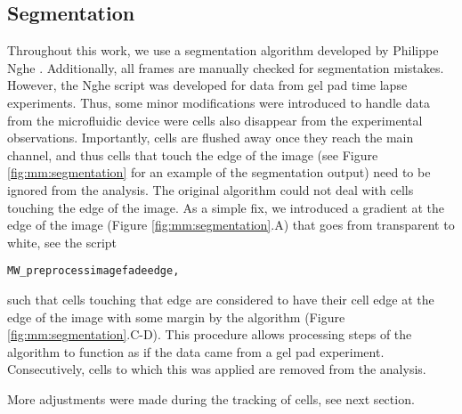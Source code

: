\subsection{Segmentation}

Throughout this work, we use a segmentation algorithm developed by Philippe Nghe \cite{Walker2016t}. Additionally, all frames are manually checked for segmentation mistakes.
However, the Nghe script was developed for data from gel pad time lapse experiments.
Thus, some minor modifications were introduced to handle data from the microfluidic device were cells also disappear from the experimental observations.
%
Importantly, cells are flushed away once they reach the main channel, and thus cells that touch the edge of the image (see Figure \ref{fig:mm:segmentation} for an example of the segmentation output) need to be ignored from the analysis.
The original algorithm could not deal with cells touching the edge of the image. 
As a simple fix, we introduced a gradient at the edge of the image (Figure \ref{fig:mm:segmentation}.A) that goes from transparent to white, see the script 
\begin{verbatim}
MW_preprocessimagefadeedge, 
\end{verbatim}
such that cells touching that edge are considered to have their cell edge at the edge of the image with some margin by the algorithm (Figure \ref{fig:mm:segmentation}.C-D).
This procedure allows processing steps of the algorithm to function as if the data came from a gel pad experiment.
Consecutively, cells to which this was applied are removed from the analysis.

More adjustments were made during the tracking of cells, see next section.

